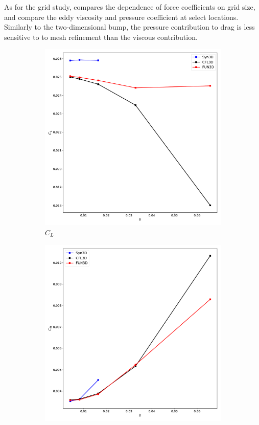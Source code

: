 As for the grid study,  compares the dependence of force coefficients on grid size,  and  compare the eddy viscosity and pressure coefficient at select locations. Similarly to the two-dimensional bump, the pressure contribution to drag is less sensitive to to mesh refinement than the viscous contribution. 
\begin{figure}[ht!]
\centering
\begin{subfigure}{.45\textwidth}
  \centering
  \includegraphics[width=1.0\textwidth]{figs/3dbump/C_L_GridStudy.pdf}
  \caption{$C_L$}
\end{subfigure}%
\begin{subfigure}{.45\textwidth}
  \centering
  \includegraphics[width=1.0\textwidth]{figs/3dbump/C_D_GridStudy.pdf}

\end{subfigure}
\end{figure}
